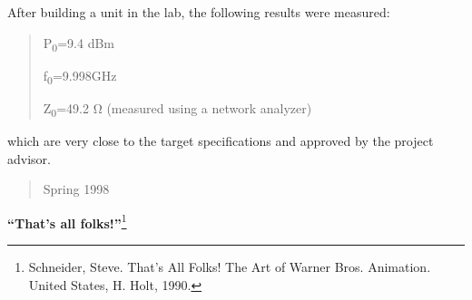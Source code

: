 After building a unit in the lab, the following results were measured:

\begin{quote}
P\textsubscript{0}=9.4 dBm

f\textsubscript{0}=9.998GHz

Z\textsubscript{0}=49.2 Ω (measured using a network analyzer)
\end{quote}

which are very close to the target specifications and approved by the
project advisor.

\begin{quote}
Spring 1998
\end{quote}

\textbf{``That's all folks!''}\footnote{Schneider, Steve. That's All
  Folks! The Art of Warner Bros. Animation. United States, H. Holt,
  1990.}

